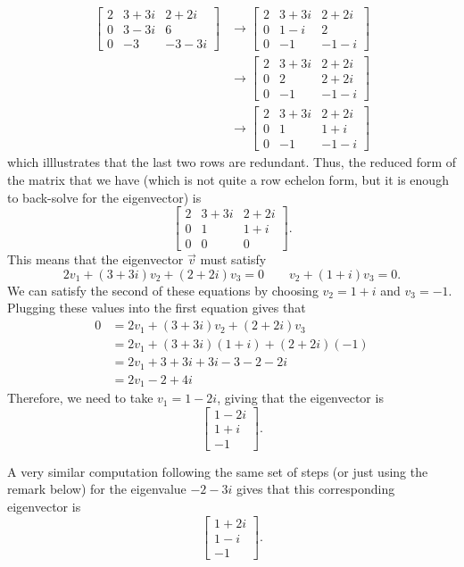 \begin{exampleSol}
\[ \begin{split}
\begin{bmatrix} 2 & 3+3i & 2+2i \\ 0 & 3-3i & 6 \\ 0 & -3 & -3-3i \end{bmatrix} &\rightarrow \begin{bmatrix} 2 & 3+3i & 2+2i \\ 0 & 1-i & 2 \\ 0 & -1 & -1-i \end{bmatrix} \\
&\rightarrow \begin{bmatrix} 2 & 3+3i & 2+2i \\ 0 & 2 & 2+2i \\ 0 & -1 & -1-i \end{bmatrix} \\
&\rightarrow \begin{bmatrix} 2 & 3+3i & 2+2i \\ 0 & 1 & 1+i \\ 0 & -1 & -1-i \end{bmatrix}
\end{split}
\] which illlustrates that the last two rows are redundant. Thus, the reduced form of the matrix that we have (which is not quite a row echelon form, but it is enough to back-solve for the eigenvector) is
\[ \begin{bmatrix} 2 & 3+3i & 2+2i \\ 0 & 1 & 1+i \\ 0 & 0 & 0 \end{bmatrix}.\]
This means that the eigenvector $\vec{v}$ must satisfy
\[ 2v_1 + (3+3i)v_2 + (2+2i)v_3 = 0 \qquad v_2 + (1+i)v_3 = 0. \]
We can satisfy the second of these equations by choosing $v_2 = 1+i$ and $v_3 = -1$. Plugging these values into the first equation gives that
\[ \begin{split}
0 &= 2v_1 + (3+3i)v_2 + (2+2i)v_3 \\
&= 2v_1 + (3+3i)(1+i) + (2+2i)(-1) \\
&= 2v_1 + 3 + 3i + 3i - 3 - 2 - 2i \\
&= 2v_1 - 2 + 4i
\end{split} \]
Therefore, we need to take $v_1 = 1 - 2i$, giving that the eigenvector is
\[ \begin{bmatrix} 1 - 2i \\ 1+i \\ -1 \end{bmatrix}. \]

A very similar computation following the same set of steps (or just using the remark below) for the eigenvalue $-2-3i$ gives that this corresponding eigenvector is 
\[ \begin{bmatrix} 1 + 2i \\ 1-i \\ -1 \end{bmatrix}. \]

\end{exampleSol}

